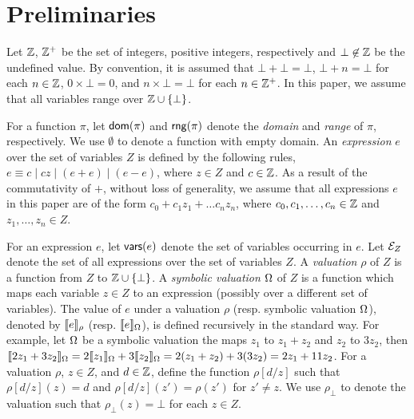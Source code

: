 
\section{Preliminaries}
\label{sec:preliminaries}
Let ${\mathbb{Z} }$,  ${\mathbb{Z} }^+$ be the set of integers, positive integers, respectively and $\bot \not \in {\mathbb{Z} }$ be  the undefined value. By convention, it is assumed that $\bot + \bot = \bot$, $\bot + n = \bot$ for each $n \in {\mathbb{Z} }$, $0 \times \bot = 0$, and $n \times \bot = \bot$ for each $n \in {\mathbb{Z} }^+$.
In this paper, we assume that all variables range over ${\mathbb{Z} } \cup \{\bot\}$.  

For a function $\pi$, let $\mathsf{dom}(\pi)$ and $\mathsf{rng}(\pi)$ denote the \emph{domain}  and \emph{range} of $\pi$, respectively. We use $\emptyset$ to denote a function with empty domain. An \emph{expression} $e$ over the set of variables $Z$ is defined by the following rules, $e\equiv  c \mid  c z \mid (e + e) \mid (e - e)$, where $z \in Z$ and $c\in {\mathbb{Z} }$.  As a result of the commutativity of $+$, without loss of generality, we assume that all expressions $e$ in this paper are of the form $c_0 + c_1 z_1 + \dots c_n z_n$, where $c_0, c_1,\dots,c_n \in {\mathbb{Z} }$ and $z_1,\dots,z_n \in Z$. 


For an expression $e$, let $\mathsf{vars}(e)$ denote the set of variables occurring in $e$. Let ${\mathcal{E} }_Z$ denote the set of all expressions over the set of variables $Z$. 
A \emph{valuation} $\rho$ of $Z$ is a function from $Z$ to ${\mathbb{Z} }\cup\{\bot\}$. A \emph{symbolic valuation} $\Omega$ of $Z$ is a function which maps each variable $z \in Z$ to an expression (possibly over a different set of variables). The value of $e$ under a valuation $\rho$ (resp. symbolic valuation $\Omega$), denoted by $\llbracket e\rrbracket_{\rho}$ (resp. $\llbracket e\rrbracket_{\Omega}$), is defined recursively in the standard way. For example, let $\Omega$ be a symbolic valuation the maps $z_1$ to $z_1+z_2$ and $z_2$ to $3z_2$, then $\llbracket2z_1+3z_2\rrbracket_{\Omega}=2\llbracket z_1\rrbracket_{\Omega}+3\llbracket z_2\rrbracket_{\Omega}=2(z_1+z_2)+3(3z_2)=2z_1+11z_2$.
For a valuation $\rho$, $z\in Z$, and $d \in {\mathbb{Z} }$, define the function $\rho[d/z]$ such that $\rho[d/z](z)=d$ and $\rho[d/z](z')=\rho(z')$ for $z'\neq z$. We use $\rho_\bot$ to denote the valuation such that $\rho_\bot(z) = \bot$ for each $z \in Z$.

